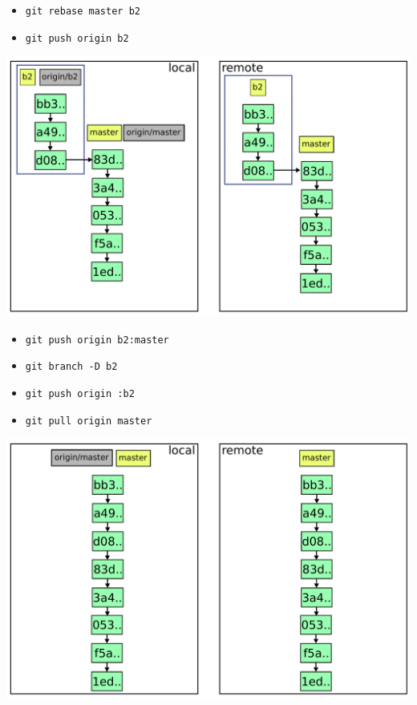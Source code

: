 \documentclass{beamer}
\begin{document}
\begin{frame}{}
  \begin{itemize}
  \item \lstinline|git rebase master b2|
  \item \lstinline|git push origin b2|
  \end{itemize}
\end{frame}

\begin{frame}{}
  \includegraphics[width=\textwidth]{img/9.pdf}
\end{frame}

\begin{frame}{}
  \begin{itemize}
  \item \lstinline|git push origin b2:master|
  \item \lstinline|git branch -D b2|
  \item \lstinline|git push origin :b2|
  \item \lstinline|git pull origin master|
  \end{itemize}
\end{frame}

\begin{frame}{}
  \includegraphics[width=\textwidth]{img/10.pdf}
\end{frame}
\end{document}

